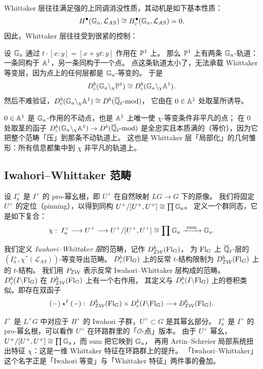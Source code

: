 Whittaker 层往往满足强的上同调消没性质，其动机是如下基本性质：
\[
H^{\bullet}(\mathbb{G}_a,\mathcal{L}_{AS})\cong H^{\bullet}_c(\mathbb{G}_a,\mathcal{L}_{AS})=0 .
\]
因此，Whittaker 层往往受到很紧的控制：

\begin{example}
设 $\mathbb{G}_a$ 通过 $t\cdot[x:y]=[x+yt:y]$ 作用在 $\mathbb{P}^1$ 上。
那么 $\mathbb{P}^1$ 上有两条 $\mathbb{G}_a$-轨道：一条同构于 $\mathbb{A}^1$，另一条同构于一个点。
点这条轨道太小了，无法承载 Whittaker 等变层，因为点上的任何层都是 $\mathbb{G}_a$-等变的。
于是
\[
D^b_c(\mathbb{G}_a\backslash_{\chi}\mathbb{P}^1)\cong D^b_c(\mathbb{G}_a\backslash_{\chi}\mathbb{A}^1).
\]
然后不难验证，$D^b_c(\mathbb{G}_a\backslash_{\chi}\mathbb{A}^1)\cong D^b(\overline{\mathbb{Q}}_{\ell}\text{-}\mathrm{mod})$，
它由在 $0\in\mathbb{A}^1$ 处取茎所诱导。
\end{example}

\begin{yizhu}[原文含糊：例 4.1.1 的「取茎」]
$0\in\mathbb{A}^1$ 是 $\mathbb{G}_a$-作用的不动点，也是 $\mathbb{A}^1$ 上唯一使 $\chi$-等变条件非平凡的点；
在 $0$ 处取茎的函子 $D^b_c(\mathbb{G}_a\backslash_\chi\mathbb{A}^1)\to D^b(\overline{\mathbb{Q}}_{\ell}\text{-}\mathrm{mod})$
是全忠实且本质满的（等价），因为它把整个范畴「压」到那条不动轨道上。
这也是 Whittaker 层「局部化」的几何雏形：所有信息都集中到 $\chi$ 非平凡的轨道上。
\end{yizhu}

\subsection{Iwahori–Whittaker 范畴}\label{sec:iwcat}

设 $I^+_u$ 是 $I^+$ 的 pro-幂幺根，即 $U^+$ 在自然映射 $LG\to G$ 下的原像。
我们将固定 $U^+$ 的定位（pinning），以得到同构 $U^+/[U^+,U^+]\cong\prod\mathbb{G}_a$。
定义一个群同态，它是如下复合：
\[
\chi:\;I^+_u\longrightarrow U^+\longrightarrow U^+/[U^+,U^+]\cong\prod\mathbb{G}_a\xrightarrow{\ \mathrm{sum}\ }\mathbb{G}_a .
\]

我们定义 \emph{Iwahori–Whittaker 层}的范畴，记作 $D^b_{\mathcal{IW}}(\mathrm{Fl}_G)$，
为 $\mathrm{Fl}_G$ 上 $\overline{\mathbb{Q}}_{\ell}$-层的 $(I^+_u,\chi^*(\mathcal{L}_{AS}))$-等变导出范畴。
$D^b_c(\mathrm{Fl}_G)$ 上的反常 $t$-结构限制为 $D^b_{\mathcal{IW}}(\mathrm{Fl}_G)$ 上的 $t$-结构。
我们用 $P_{\mathcal{IW}}$ 表示反常 Iwahori–Whittaker 层构成的范畴。
$D^b_c(I\backslash\mathrm{Fl}_G)$ 在 $D^b_{\mathcal{IW}}(\mathrm{Fl}_G)$ 上有一个右作用，
其定义与 $D^b_c(I\backslash\mathrm{Fl}_G)$ 上的卷积类似。即存在双函子
\[
(-)\star^{I}(-):\;D^b_{\mathcal{IW}}(\mathrm{Fl}_G)\times D^b_c(I\backslash\mathrm{Fl}_G)\longrightarrow D^b_{\mathcal{IW}}(\mathrm{Fl}_G).
\]

\begin{yizhu}
$I^+$ 是 $L^+G$ 中对应于 $B^+$ 的 Iwahori 子群，$U^+\subset G$ 是其幂幺部分。
$I^+_u$ 是 $I^+$ 的 pro-幂幺根，可以看作 $U^+$ 在环路群里的「$\mathcal{O}$-点」版本。
由于 $U^+$ 幂幺，$U^+/[U^+,U^+]\cong\prod\mathbb{G}_a$，而 $\mathrm{sum}$ 把它映到 $\mathbb{G}_a$，
再用 Artin–Schreier 局部系统扭出特征 $\chi$：这是一维 Whittaker 特征在环路群上的提升。
「Iwahori–Whittaker」这个名字正是「Iwahori 等变」与「Whittaker 特征」两件事的叠加。
\end{yizhu}

